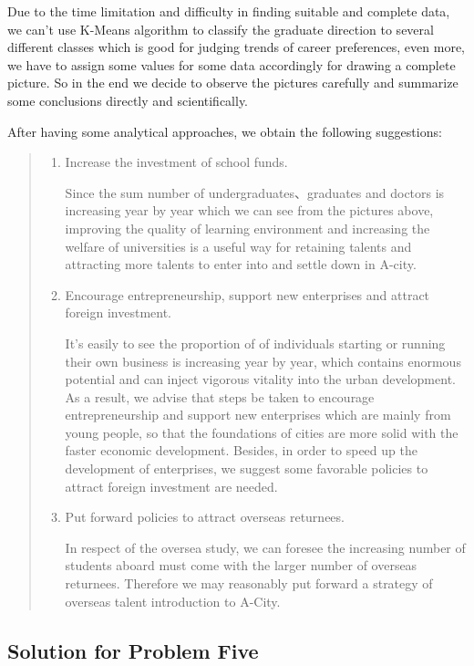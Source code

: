 \documentclass{mcmthesis}
\begin{document}
\noindent
Due to the time limitation and difficulty in finding suitable and complete data, we can't use K-Means algorithm to classify the graduate direction to several different classes which is good for judging trends of career preferences, even more, we have to assign some values for some data accordingly for drawing a complete picture. So in the end we decide to observe the pictures carefully and summarize some conclusions directly and scientifically.\par\noindent
After having some analytical approaches, we obtain the following suggestions:
\begin{quote}
	\begin{enumerate}
		\item Increase the investment of school funds.\par
		Since the sum number of undergraduates、graduates and doctors is increasing year by year which we can see from the pictures above, improving the quality of learning environment and increasing the welfare of universities is a useful way for retaining talents and attracting more talents to enter into and settle down in A-city.
		\item Encourage entrepreneurship, support new enterprises and attract foreign investment.\par
		It's easily to see the proportion of of individuals starting or running their own business is increasing year by year, which contains enormous potential and can inject vigorous vitality into the urban development. As a result, we advise that steps be taken to encourage entrepreneurship and support new enterprises which are mainly from young people, so that the foundations of cities are more solid with the faster economic development. Besides, in order to speed up the development of enterprises, we suggest some favorable policies to attract foreign investment are needed.
		\item Put forward policies to attract overseas returnees.\par
		In respect of the oversea study, we can foresee the increasing number of students aboard must come with the larger number of overseas returnees. Therefore we may reasonably put forward a strategy of overseas talent introduction to A-City.
	\end{enumerate}
	
\end{quote} 
\subsection{Solution for Problem Five}
\end{document}
